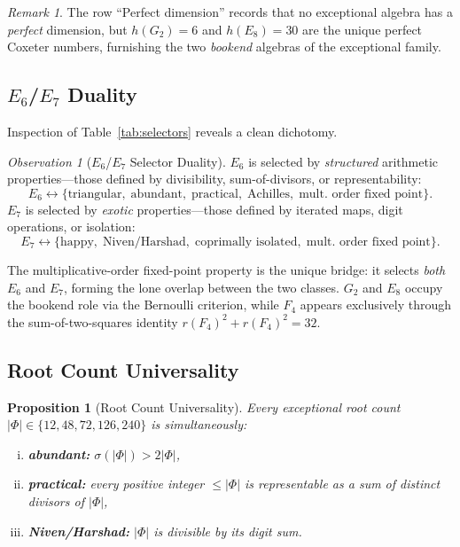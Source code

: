 \documentclass[11pt]{amsart}
\theoremstyle{plain}
\newtheorem{proposition}[theorem]{Proposition}
\theoremstyle{definition}
\theoremstyle{remark}
\newtheorem{remark}[theorem]{Remark}
\newtheorem{observation}[theorem]{Observation}
\renewcommand{\Phi}{\varPhi}
\begin{document}
\begin{remark}
The row ``Perfect dimension'' records that no exceptional algebra has a
\emph{perfect} dimension, but $h(G_2)=6$ and $h(E_8)=30$ are the unique
perfect Coxeter numbers, furnishing the two \emph{bookend} algebras of the
exceptional family.
\end{remark}

\subsection{\texorpdfstring{$E_6$/$E_7$}{E6/E7} Duality}%
\label{subsec:e6e7-duality}

Inspection of Table~\ref{tab:selectors} reveals a clean dichotomy.

\begin{observation}[$E_6$/$E_7$ Selector Duality]\label{obs:e6e7-duality}
$E_6$ is selected by \emph{structured} arithmetic properties---those defined by
divisibility, sum-of-divisors, or representability:
\[
  E_6 \longleftrightarrow
  \{\text{triangular},\;\text{abundant},\;\text{practical},\;\text{Achilles},\;
    \text{mult.\ order fixed point}\}.
\]
$E_7$ is selected by \emph{exotic} properties---those defined by iterated maps,
digit operations, or isolation:
\[
  E_7 \longleftrightarrow
  \{\text{happy},\;\text{Niven/Harshad},\;\text{coprimally isolated},\;
    \text{mult.\ order fixed point}\}.
\]
\end{observation}

The multiplicative-order fixed-point property is the unique bridge: it selects
\emph{both} $E_6$ and $E_7$, forming the lone overlap between the two classes.
$G_2$ and $E_8$ occupy the bookend role via the Bernoulli criterion, while $F_4$
appears exclusively through the sum-of-two-squares identity
$r(F_4)^2 + r(F_4)^2 = 32$.

\subsection{Root Count Universality}\label{subsec:root-universality}

\begin{proposition}[Root Count Universality]\label{prop:root-universality}
Every exceptional root count
$|\Phi| \in \{12, 48, 72, 126, 240\}$
is simultaneously:
\begin{enumerate}[(i)]
  \item \textbf{abundant:} $\sigma(|\Phi|) > 2|\Phi|$,
  \item \textbf{practical:} every positive integer $\le |\Phi|$ is
        representable as a sum of distinct divisors of $|\Phi|$,
  \item \textbf{Niven/Harshad:} $|\Phi|$ is divisible by its digit sum.
\end{enumerate}
\end{proposition}
\end{document}
